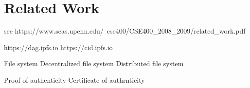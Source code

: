 
\chapter{Related Work}
\label{ch:related}
see https://www.seas.upenn.edu/~cse400/CSE400_2008_2009/related_work.pdf

https://dag.ipfs.io
https://cid.ipfs.io


File system
Decentralized file system
Distributed file system

Proof of authenticity
Certificate of authrnticity